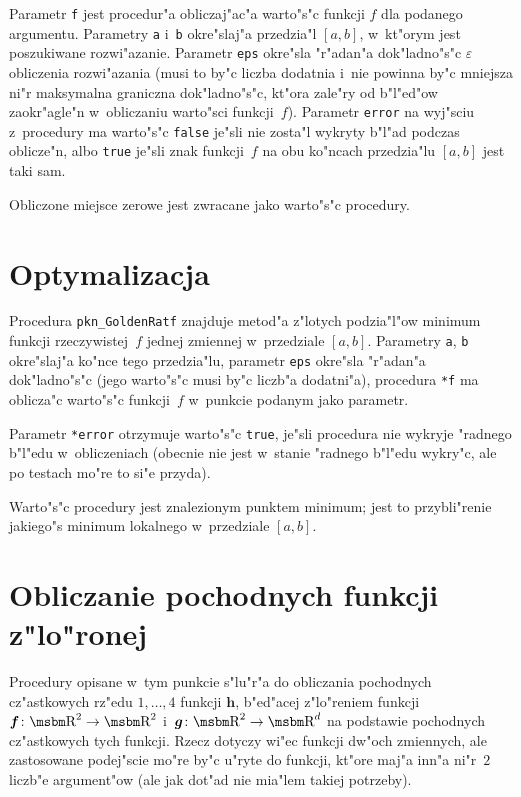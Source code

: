 Parametr \texttt{f} jest procedur"a obliczaj"ac"a warto"s"c funkcji $f$ dla
podanego argumentu. Parametry \texttt{a} i~\texttt{b} okre"slaj"a przedzia"l
$[a,b]$, w~kt"orym jest poszukiwane rozwi"azanie. Parametr \texttt{eps}
okre"sla "r"adan"a dok"ladno"s"c $\varepsilon$ obliczenia rozwi"azania
(musi to by"c liczba dodatnia i~nie powinna by"c mniejsza ni"r maksymalna
graniczna dok"ladno"s"c, kt"ora zale"ry od b"l"ed"ow zaokr"agle"n
w~obliczaniu warto"sci funkcji~$f$). Parametr \texttt{error} na wyj"sciu
z~procedury ma warto"s"c \texttt{false} je"sli nie zosta"l wykryty b"l"ad
podczas oblicze"n, albo \texttt{true} je"sli znak funkcji~$f$ na obu
ko"ncach przedzia"lu $[a,b]$ jest taki sam.

Obliczone miejsce zerowe jest zwracane jako warto"s"c procedury.


\newpage
\section{Optymalizacja}

\hspace*{\parindent}%
Procedura \texttt{pkn\_GoldenRatf} znajduje metod"a z"lotych podzia"l"ow
minimum funkcji rzeczywistej~$f$ jednej zmiennej w~przedziale $[a,b]$.
Parametry \texttt{a}, \texttt{b} okre"slaj"a ko"nce tego przedzia"lu,
parametr \texttt{eps} okre"sla "r"adan"a dok"ladno"s"c (jego warto"s"c
musi by"c liczb"a dodatni"a), procedura \texttt{*f} ma oblicza"c warto"s"c
funkcji~$f$ w~punkcie podanym jako parametr.

Parametr \texttt{*error} otrzymuje warto"s"c \texttt{true}, je"sli procedura
nie wykryje "radnego b"l"edu w~obliczeniach (obecnie nie jest w~stanie "radnego
b"l"edu wykry"c, ale po testach mo"re to si"e przyda).

Warto"s"c procedury jest znalezionym punktem minimum; jest to przybli"renie
jakiego"s minimum lokalnego w~przedziale $[a,b]$.


\newpage
\section{Obliczanie pochodnych funkcji z"lo"ronej}

Procedury opisane w~tym punkcie s"lu"r"a do obliczania pochodnych cz"astkowych
rz"edu $1,\ldots,4$ funkcji $\bm{h}$, b"ed"acej z"lo"reniem funkcji
$\bm{f}\colon\R^2\rightarrow\R^2$ i~$\bm{g}\colon\R^2\rightarrow\R^d$
na podstawie pochodnych cz"astkowych tych funkcji. Rzecz dotyczy wi"ec funkcji
dw"och zmiennych, ale zastosowane podej"scie mo"re by"c u"ryte do funkcji,
kt"ore maj"a inn"a ni"r~$2$ liczb"e argument"ow (ale jak dot"ad nie mia"lem
takiej potrzeby).

